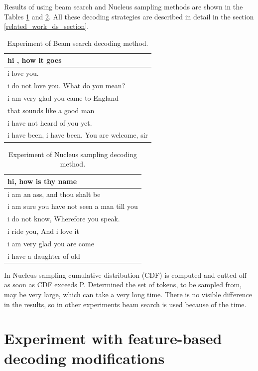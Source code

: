 Results of using beam search and Nucleus sampling methods are shown in the Tables \ref{tab:beam_search} and \ref{tab:nucleus_sampling}. All these decoding strategies are described in detail in the section \ref{related_work_ds_section}.
\begin{table}[ht]
\centering
 \begin{tabular}{|p{14cm}|} 
 \hline\hline
 hi , how it goes \\
 \hline
 i love you. \\
 \hline
 i do not love you. What do you mean? \\
 \hline 
 i am very glad you came to England \\
 \hline 
 that sounds like a good man \\
 \hline 
 i have not heard of you yet. \\
 \hline 
 i have been, i have been. You are welcome, sir \\
 \hline\hline
 \end{tabular}
 \caption{Experiment of Beam search decoding method.}
\label{tab:beam_search}
\end{table}

\begin{table}[ht]
\centering
 \begin{tabular}{|p{14cm}|} 
 \hline\hline
  hi, how is thy name \\
 \hline
  i am an ass, and thou shalt be \\
 \hline
  i am sure you have not seen a man till you \\
 \hline 
  i do not know, Wherefore you speak. \\
 \hline 
 i ride you, And i love it \\
 \hline 
 i am very glad you are come \\
 \hline 
 i have a daughter of old \\
 \hline\hline
 \end{tabular}
 \caption{Experiment of Nucleus sampling decoding method.}
\label{tab:nucleus_sampling}
\end{table}

In Nucleus sampling cumulative distribution (CDF) is computed and cutted off as soon as CDF exceeds P. Determined the set of tokens, to be sampled from, may be very large, which can take a very long time. There is no visible difference in the results, so in other experiments beam search is used because of the time.

\section{Experiment with feature-based decoding modifications}
